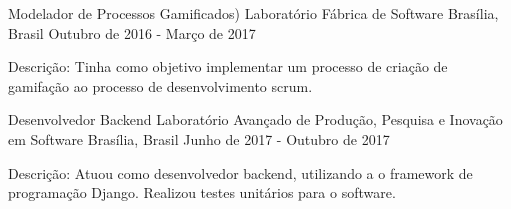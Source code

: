 \begin{cventries}
  \cventry
    {Modelador de Processos Gamificados)}
    {Laboratório Fábrica de Software}
    {Brasília, Brasil}
    {Outubro de 2016 - Março de 2017}
    {
      \begin{cvitems}
        \item {Descrição: Tinha como objetivo implementar um processo de criação de gamifação ao processo de desenvolvimento scrum.}
      \end{cvitems}
    }
  \cventry
    {Desenvolvedor Backend}
    {Laboratório Avançado de Produção, Pesquisa e Inovação em Software}
    {Brasília, Brasil}
    {Junho de 2017 - Outubro de 2017}
    {
      \begin{cvitems}
        \item {Descrição: Atuou como desenvolvedor backend, utilizando a o framework de programação Django. Realizou testes unitários para o software.}
      \end{cvitems}
    }
\end{cventries}
